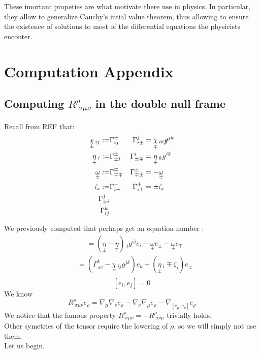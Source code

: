 \documentclass[a4paper,11pt]{article}
\numberwithin{equation}{section}
\theoremstyle{definition}
\begin{document}
These imortant propeties are what motivate there use in physics. In particular, they allow to generalize Cauchy's intial value theorem, thus allowing to ensure the existence of solutions to most of the differential equations the physicists enconter.

\newpage
\section{Computation Appendix}
\subsection{Computing $R^\rho_{\;\sigma\mu\nu}$ in the double null frame} 
Recall from \color{red} REF \color{black} that:
\begin{align*}
    \underset{\pm}{\chi}\,_{ij} :=&\Gamma_{ij}^\pm &\Gamma_{i\pm}^j&=\underset{\mp}{\chi}\,_{ik}\cancel{g}^{jk}\\
    \underset{\pm}{\eta}\,_i :=&\Gamma_{\pm i}^\pm &\Gamma_{\pm\mp}^i&=\underset{\pm}{\eta}\,_kg^{ik}\\
    \underset{\pm}{\omega}:=&\Gamma_{\mp\mp}^\mp &\Gamma_{\mp\pm}^\pm&=-\underset{\pm}{\omega}\\
    \zeta_i :=& \Gamma_{i+}^+ &\Gamma_{i\pm}^\pm&=\pm\zeta_i \\
    \Gamma_{\pm i}^j&\\
    \Gamma_{ij}^k&
\end{align*}

We previously computed that \color{red} perhaps get an equation number \color{black}:
\begin{align*}
    [e_\pm,e_\mp]
    &=(\underset{\pm}{\eta}-\underset{\mp}{\eta})\,_jg^{ij} e_i+ \underset{\pm}{\omega} e_\pm - \underset{\mp}{\omega} e_\mp
\end{align*}
\begin{align*}
    [e_\pm,e_i]&=(\Gamma_{\pm i}^k - \underset{\mp}{\chi}\,_{ij}g^{jk}) e_k + (\underset{\pm}{\eta}\,_i \mp \zeta_i) e_\pm\\
\end{align*}
$$[e_i,e_j]=0$$
We know 
\begin{equation}
    R^\rho_{\;\sigma\mu\nu} e_\rho = \nabla_\mu\nabla_\nu e_\rho-\nabla_\nu\nabla_\mu e_\rho-\nabla_{[e_\mu,e_\nu]}e_\rho
\end{equation}
We notice that the famous property $R^\rho_{\;\sigma\mu\nu}=-R^\rho_{\;\sigma\nu\mu}$ trivially holds.\\
Other symetries of the tensor require the lowering of $\rho$, so we will simply not use them.\\
Let us begin.
\end{document}

